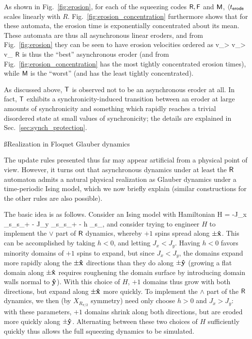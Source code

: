 \documentclass[pra,aps,twocolumn,groupedaddress,superscriptaddress,nofootinbib,preprintnumbers]{revtex4-2}
\begin{document}
	As shown in Fig.~\ref{fig:erosion}, for each of the squeezing codes $\mathsf{R},\mathsf{F}$ and $\mathsf{M}$, $\langle t_{\sf erode}$ scales linearly with $R$. Fig.~\ref{fig:erosion_concentration} furthermore shows that for these automata, the erosion time is exponentially concentrated about its mean. These automata are thus all asynchronous linear eroders, and from Fig.~\ref{fig:erosion} they can be seen to have erosion velocities ordered as 
	\be \label{erosion_speeds} v_\sfR> v_\sfF > v_\sfM\ee 
	$\mathsf{R}$ is thus the ``best'' asynchronous eroder (and from Fig.~\ref{fig:erosion_concentration} has the most tightly concentrated erosion times), while $\mathsf{M}$ is the ``worst'' (and has the least tightly concentrated). 
	
	As discussed above, $\mathsf{T}$ is observed not to be an asynchronous eroder at all. In fact, $\mathsf{T}$ exhibits a synchronicity-induced transition between an eroder at large amounts of synchronicity and something which rapidly reaches a trivial disordered state at small values of synchronicity; the details are explained in Sec.~\ref{sec:synch_protection}. 
	
	
	\ss{Realization in Floquet Glauber dynamics}	\label{ss:glauber} 
	
	The update rules presented thus far may appear artificial from a physical point of view. However, it turns out that asynchronous dynamics under at least the $\mathsf{R}$ automaton admits a natural physical realization as Glauber dynamics under a time-periodic Ising model, which we now briefly explain (similar constructions for the other rules are also possible).
	
	The basic idea is as follows. Consider an Ising model with Hamiltonian 
	\be H = -J_x \sum_\bfr s_\bfr s_{\bfr+\uvx} - J_y \sum_\bfr s_\bfr s_{\bfr+\uvy} - h \sum_\bfr s_\bfr,\ee 
	and consider trying to engineer $H$ to implement the $\vee$ part of $\mathsf{R}$ dynamics, whereby $+1$ spins spread along $\pm{\mathbf{\hat x}}$. This can be accomplished by taking $h<0$, and letting $J_x < J_y$. Having $h<0$ favors minority domains of $+1$ spins to expand, but since $J_x < J_y$, the domains expand more rapidly along the $\pm {\mathbf{\hat x}}$ directions than they do along $\pm{\mathbf{\hat y}}$ (growing a flat domain along $\pm{\mathbf{\hat x}}$ requires roughening the domain surface by introducing domain walls normal to ${\mathbf{\hat y}}$). With this choice of $H$, $+1$ domains thus grow with both directions, but expand along $\pm{\mathbf{\hat x}}$ more quickly. 
	To implement the $\wedge$ part of the $\mathsf{R}$ dynamics, we then (by $X_{R_{\pi/2}}$ symmetry) need only choose $h>0$ and $J_x > J_y$: with these parameters, $+1$ domains shrink along both directions, but are eroded more quickly along $\pm{\mathbf{\hat y}}$. Alternating between these two choices of $H$ sufficiently quickly thus allows the full squeezing dynamics to be simulated.
	
\end{document}
